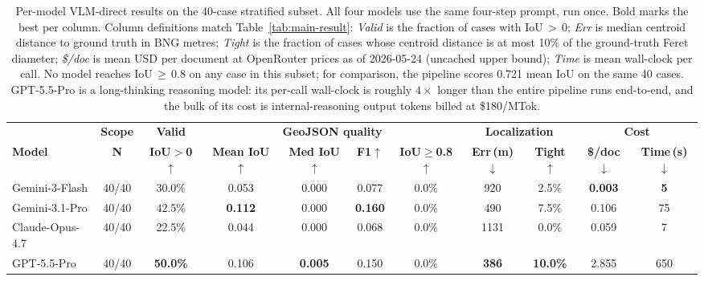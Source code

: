 \documentclass[11pt]{article}
\begin{document}
\begin{table}[t]
\centering
\footnotesize
\setlength{\tabcolsep}{2.5pt}
\renewcommand{\arraystretch}{1.05}
\begin{tabular}{@{}l c c cccc cc cc@{}}
\toprule
 & \textbf{Scope} & \textbf{Valid} & \multicolumn{4}{c}{\textbf{GeoJSON quality}} & \multicolumn{2}{c}{\textbf{Localization}} & \multicolumn{2}{c}{\textbf{Cost}} \\
\cmidrule(lr){4-7} \cmidrule(lr){8-9} \cmidrule(lr){10-11}
\textbf{Model} & \textbf{N} & \textbf{IoU$>$0$\uparrow$} & \textbf{Mean IoU$\uparrow$} & \textbf{Med IoU$\uparrow$} & \textbf{F1$\uparrow$} & \textbf{IoU$\geq$0.8$\uparrow$} & \textbf{Err\,(m)$\downarrow$} & \textbf{Tight$\uparrow$} & \textbf{\$/doc$\downarrow$} & \textbf{Time\,(s)$\downarrow$} \\
\midrule
Gemini-3-Flash         & 40/40 & 30.0\% & 0.053 & 0.000 & 0.077 & 0.0\% & 920  & 2.5\% & \textbf{0.003} & \textbf{5}   \\
Gemini-3.1-Pro         & 40/40 & 42.5\% & \textbf{0.112} & 0.000 & \textbf{0.160} & 0.0\% & 490  & 7.5\% & 0.106 & 75  \\
Claude-Opus-4.7        & 40/40 & 22.5\% & 0.044 & 0.000 & 0.068 & 0.0\% & 1131 & 0.0\% & 0.059 & 7   \\
GPT-5.5-Pro            & 40/40 & \textbf{50.0\%} & 0.106 & \textbf{0.005} & 0.150 & 0.0\% & \textbf{386}  & \textbf{10.0\%} & 2.855 & 650 \\
\bottomrule
\end{tabular}
\caption{Per-model VLM-direct results on the 40-case stratified subset. All four models use the same four-step prompt, run once. Bold marks the best per column. Column definitions match Table~\ref{tab:main-result}: \emph{Valid} is the fraction of cases with IoU\,$>$\,0; \emph{Err} is median centroid distance to ground truth in BNG metres; \emph{Tight} is the fraction of cases whose centroid distance is at most 10\% of the ground-truth Feret diameter; \emph{\$/doc} is mean USD per document at OpenRouter prices as of 2026-05-24 (uncached upper bound); \emph{Time} is mean wall-clock per call. No model reaches IoU\,$\geq$\,0.8 on any case in this subset; for comparison, the pipeline scores 0.721 mean IoU on the same 40 cases. GPT-5.5-Pro is a long-thinking reasoning model: its per-call wall-clock is roughly $4\times$ longer than the entire pipeline runs end-to-end, and the bulk of its cost is internal-reasoning output tokens billed at \$180/MTok.}
\label{tab:vlm-models}
\end{table}
\end{document}
